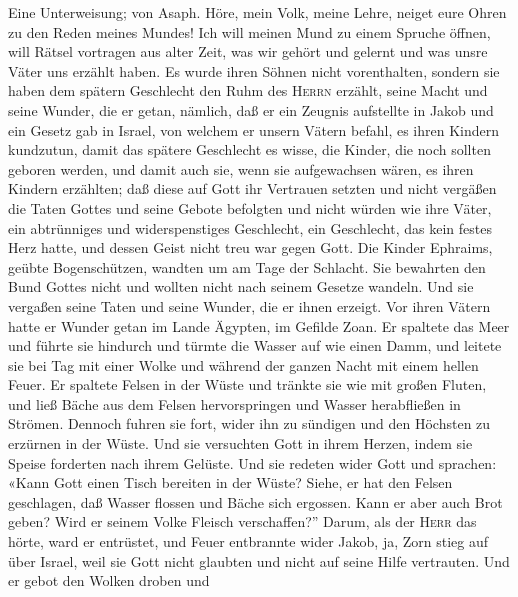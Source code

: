  Eine Unterweisung; von Asaph. Höre, mein Volk, meine
Lehre, neiget eure Ohren zu den Reden meines Mundes!  Ich
will meinen Mund zu einem Spruche öffnen, will Rätsel vortragen aus
alter Zeit,  was wir gehört und gelernt und was unsre
Väter uns erzählt haben.  Es wurde ihren Söhnen nicht
vorenthalten, sondern sie haben dem spätern Geschlecht den Ruhm des
\textsc{Herrn} erzählt, seine Macht und seine Wunder, die er getan,
 nämlich, daß er ein Zeugnis aufstellte in Jakob und ein
Gesetz gab in Israel, von welchem er unsern Vätern befahl, es ihren
Kindern kundzutun,  damit das spätere Geschlecht es wisse,
die Kinder, die noch sollten geboren werden, und damit auch sie, wenn
sie aufgewachsen wären, es ihren Kindern erzählten;  daß
diese auf Gott ihr Vertrauen setzten und nicht vergäßen die Taten Gottes
und seine Gebote befolgten  und nicht würden wie ihre
Väter, ein abtrünniges und widerspenstiges Geschlecht, ein Geschlecht,
das kein festes Herz hatte, und dessen Geist nicht treu war gegen Gott.
 Die Kinder Ephraims, geübte Bogenschützen, wandten um am
Tage der Schlacht.  Sie bewahrten den Bund Gottes nicht
und wollten nicht nach seinem Gesetze wandeln.  Und sie
vergaßen seine Taten und seine Wunder, die er ihnen erzeigt.
 Vor ihren Vätern hatte er Wunder getan im Lande Ägypten,
im Gefilde Zoan.  Er spaltete das Meer und führte sie
hindurch und türmte die Wasser auf wie einen Damm,  und
leitete sie bei Tag mit einer Wolke und während der ganzen Nacht mit
einem hellen Feuer.  Er spaltete Felsen in der Wüste und
tränkte sie wie mit großen Fluten,  und ließ Bäche aus
dem Felsen hervorspringen und Wasser herabfließen in Strömen.
 Dennoch fuhren sie fort, wider ihn zu sündigen und den
Höchsten zu erzürnen in der Wüste.  Und sie versuchten
Gott in ihrem Herzen, indem sie Speise forderten nach ihrem Gelüste.
 Und sie redeten wider Gott und sprachen: «Kann Gott
einen Tisch bereiten in der Wüste?  Siehe, er hat den
Felsen geschlagen, daß Wasser flossen und Bäche sich ergossen. Kann er
aber auch Brot geben? Wird er seinem Volke Fleisch verschaffen?''
 Darum, als der \textsc{Herr} das hörte, ward er
entrüstet, und Feuer entbrannte wider Jakob, ja, Zorn stieg auf über
Israel,  weil sie Gott nicht glaubten und nicht auf seine
Hilfe vertrauten.  Und er gebot den Wolken droben und
